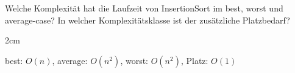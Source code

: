 \question[2]
Welche Komplexität hat die Laufzeit von InsertionSort im best, worst und average-case?
In welcher Komplexitätsklasse ist der zusätzliche Platzbedarf?

\begin{solutionbox}{2cm}

best: $O(n)$, average: $O(n^2)$, worst: $O(n^2)$, Platz: $O(1)$
\end{solutionbox}
